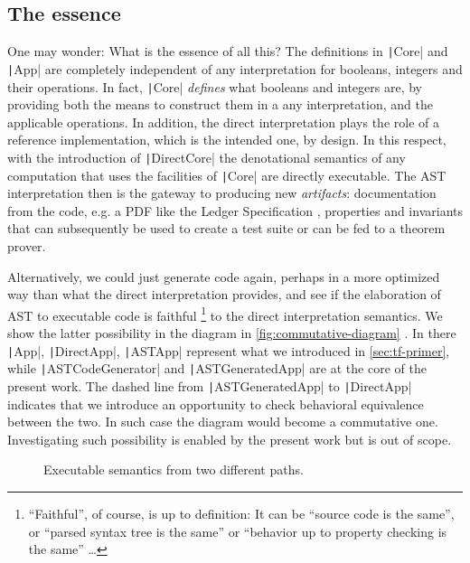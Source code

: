 \documentclass[11pt]{article}
\renewcommand{\vref}[1]{\autoref{#1} \vpageref{#1}}{}
\newcommand{\Scala}[1]{\texttt|#1|}
\newcommand{\ScalaI}[1]{\texttt|#1|}
\newcommand{\TextI}[1]{\texttt|#1|}
\begin{document}
\subsection{The essence}
One may wonder: What is the essence of all this? The definitions in 
\ScalaI{Core} and \Scala{App} are completely independent of any 
interpretation for booleans, integers and their operations. In fact, 
\ScalaI{Core} \textit{defines} what booleans and integers are, by providing 
both the means to construct them in a any interpretation, and the applicable 
operations. In addition, the direct interpretation plays the role of a 
reference implementation, which is the intended one, by design. In this 
respect, with the introduction of \ScalaI{DirectCore} the denotational 
semantics of any computation that uses the facilities of \ScalaI{Core} are 
directly executable. The AST interpretation then is the gateway to producing 
new \textit{artifacts}: documentation from the code, e.g. a PDF like the 
Ledger Specification \cite{cardano:ledger-spec:shelley:2019}, properties and 
invariants that can subsequently be used to create a test suite or can be fed 
to a theorem prover.

Alternatively, we could just generate code again, perhaps in a more optimized 
way than what the direct interpretation provides, and see if the elaboration 
of AST to executable code is faithful%
\footnote{``Faithful'', of course, is up to definition: It can be ``source 
code is the same'', or ``parsed syntax tree is the same'' or ``behavior up to 
property checking is the same'' \dots} 
to the direct interpretation semantics. We show the latter possibility in the 
diagram in \vref{fig:commutative-diagram}. In there \ScalaI{App}, 
\ScalaI{DirectApp}, \ScalaI{ASTApp} represent what we introduced in 
\autoref{sec:tf-primer}, while \TextI{ASTCodeGenerator} and 
\TextI{ASTGeneratedApp} are at the core of the present work. The dashed line 
from \TextI{ASTGeneratedApp} to \TextI{DirectApp} indicates that we introduce 
an opportunity to check behavioral equivalence between the two. In such case 
the diagram would become a commutative one. Investigating such possibility is 
enabled by the present work but is out of scope.

\begin{figure}
\begin{center}
\end{center}
\caption{Executable semantics from two different paths.}
\label{fig:commutative-diagram}
\hrulefill
\end{figure}
\end{document}
